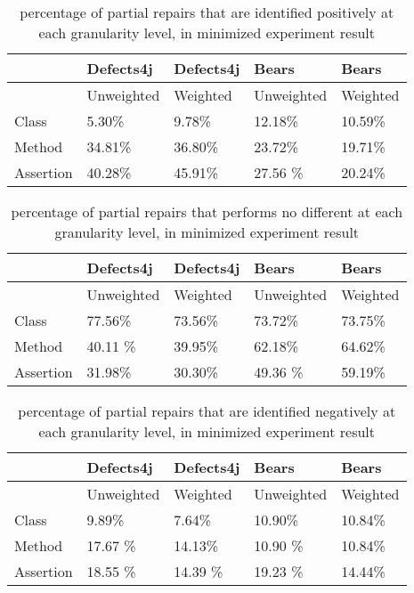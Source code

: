 \documentclass[sigconf, timestamp-false, anonymous=true]{acmart}
\begin{document}
\begin{table}
{\begin{center}
    \begin{tabular}{| l | l | l | l | l |} \hline
     & Defects4j & Defects4j & Bears & Bears  \\ \hline
     & Unweighted & Weighted & Unweighted & Weighted \\ \hline
    Class & 5.30\% & 9.78\% & 12.18\% & 10.59\%\\
    Method & 34.81\% & 36.80\% & 23.72\% & 19.71\% \\
    Assertion & 40.28\% & 45.91\% & 27.56 \% & 20.24\% \\
    \hline
    
    \end{tabular}
\end{center}}
\caption{percentage of partial repairs that are identified positively at each granularity level, in minimized experiment result}
\end{table}
    
\begin{table}
{\begin{center}
    \begin{tabular}{| l | l | l | l | l |} \hline
     & Defects4j & Defects4j & Bears & Bears  \\ \hline
     & Unweighted & Weighted & Unweighted & Weighted \\ \hline
    Class & 77.56\% & 73.56\% & 73.72\% & 73.75\%\\
    Method & 40.11 \% & 39.95\% & 62.18\% & 64.62\% \\
    Assertion & 31.98\% & 30.30\% & 49.36 \% & 59.19\% \\
    \hline
    
    \end{tabular}
    
\end{center}}
\caption{percentage of partial repairs that performs no different at each granularity level, in minimized experiment result}
\end{table}

    
\begin{table}
{\begin{center}
    \begin{tabular}{| l | l | l | l | l |} \hline
     & Defects4j & Defects4j & Bears & Bears  \\ \hline
     & Unweighted & Weighted & Unweighted & Weighted \\ \hline
    Class & 9.89\% & 7.64\% & 10.90\% & 10.84\%\\
    Method & 17.67 \% & 14.13\% & 10.90 \% & 10.84\% \\
    Assertion & 18.55 \% & 14.39 \% & 19.23 \% & 14.44\% \\
    \hline
    
    \end{tabular}
    
\end{center}}
\caption{percentage of partial repairs that are identified negatively at each granularity level, in minimized experiment result}
\end{table}
\end{document}
